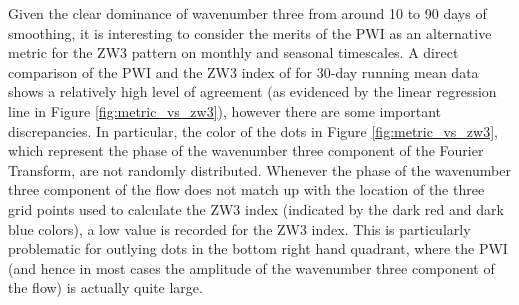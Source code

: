 Given the clear dominance of wavenumber three from around 10 to 90 days of smoothing, it is interesting to consider the merits of the PWI as an alternative metric for the ZW3 pattern on monthly and seasonal timescales. A direct comparison of the PWI and the ZW3 index of \citet{Raphael2004} for 30-day running mean data shows a relatively high level of agreement (as evidenced by the linear regression line in Figure \ref{fig:metric_vs_zw3}), however there are some important discrepancies. In particular, the color of the dots in Figure \ref{fig:metric_vs_zw3}, which represent the phase of the wavenumber three component of the Fourier Transform, are not randomly distributed. Whenever the phase of the wavenumber three component of the flow does not match up with the location of the three grid points used to calculate the ZW3 index (indicated by the dark red and dark blue colors), a low value is recorded for the ZW3 index. This is particularly problematic for outlying dots in the bottom right hand quadrant, where the PWI (and hence in most cases the amplitude of the wavenumber three component of the flow) is actually quite large.      

